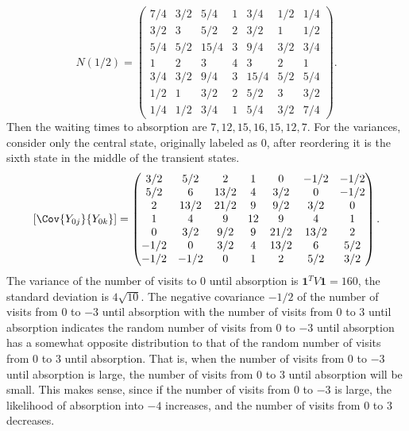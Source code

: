 \documentclass[12pt]{article}
\begin{document}
\begin{example}
    \[
        N(1/2) =
        \begin{pmatrix}
            7/4 & 3/2 & 5/4 & 1 & 3/4 & 1/2 & 1/4\\
            3/2 & 3 & 5/2 & 2 & 3/2 & 1 & 1/2\\
            5/4 & 5/2 & 15/4 & 3 & 9/4 & 3/2 & 3/4\\
            1 & 2 & 3 & 4 & 3 & 2 & 1\\
            3/4 & 3/2 & 9/4 & 3 & 15/4 & 5/2 & 5/4\\
            1/2 & 1 & 3/2 & 2 & 5/2 & 3 & 3/2 \\
            1/4 & 1/2 & 3/4 & 1 & 5/4 & 3/2 & 7/4
        \end{pmatrix}
        .
    \] Then the waiting times to absorption are \( 7, 12, 15, 16, 15,
    12, 7 \).  For the variances, consider only the central state,
    originally labeled as \( 0 \), after reordering it is the sixth
    state in the middle of the transient states.
    \[
        \left[ \Cov{Y_{0j}}{ Y_{0k}} \right] =
        \begin{pmatrix}
            3/2 & 5/2 & 2 & 1 & 0 & -1/2 & -1/2 \\
            5/2 & 6 & 13/2 & 4 & 3/2 & 0 & -1/2\\
            2 & 13/2 & 21/2 & 9 & 9/2 & 3/2 & 0\\
            1 & 4 & 9 & 12 & 9 & 4 & 1\\
            0 & 3/2 & 9/2 & 9 & 21/2 & 13/2 & 2\\
            -1/2 & 0 & 3/2 & 4 & 13/2 & 6 & 5/2\\
            -1/2 & -1/2 & 0 & 1 & 2 & 5/2 & 3/2
        \end{pmatrix}
        .
    \] The variance of the number of visits to \( 0 \) until absorption
    is \( \mathbf{1}^{T} V \mathbf{1} = 160 \), the standard deviation
    is \( 4 \sqrt{10} \).  The negative covariance \( -1/2 \) of the
    number of visits from \( 0 \) to \( -3 \) until absorption with the
    number of visits from \( 0 \) to \( 3 \) until absorption indicates
    the random number of visits from \( 0 \) to \( -3 \) until
    absorption has a somewhat opposite distribution to that of the
    random number of visits from \( 0 \) to \( 3 \) until absorption.
    That is, when the number of visits from \( 0 \) to \( -3 \) until
    absorption is large, the number of visits from \( 0 \) to \( 3 \)
    until absorption will be small.  This makes sense, since if the
    number of visits from \( 0 \) to \( -3 \) is large, the likelihood
    of absorption into \( -4 \) increases, and the number of visits from
    \( 0 \) to \( 3 \) decreases.


\end{example}
\end{document}
